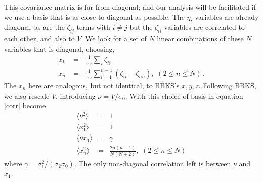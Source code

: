 \documentclass[12pt]{article}
\newcommand{\SH}[1]{\textcolor{brown}{[{\bf SH}: #1]}}
\begin{document}

%
This covariance matrix is far from diagonal; and our analysis will be facilitated if we use a basis that is as close to diagonal as possible. The $\eta_i$ variables are already diagonal, as are the $\zeta_{ij}$ terms with $i\neq j$ but the $\zeta_{ii}$ variables are correlated to each other, and also  to $V$. We look for a set of $N$ linear combinations of these $N$ variables that is diagonal, choosing,
\begin{align}
\label{BasisTransform}
x_1 &= -\frac{1}{\sigma_2}\sum_i\zeta_{ii} \nonumber \\
x_n &= -\frac{1}{\sigma_2}\sum_{i=1}^{n-1}\left(\zeta_{ii}-\zeta_{nn}\right),\,\, (2\leq n \leq N) \, .
\end{align}
%
The $x_n$ here are analogous, but not identical, to BBKS's $x, y, z$. Following BBKS, we also rescale $V$, introducing $\nu = V/\sigma_0$. With this choice of basis in equation \eqref{corr} become
%
\begin{eqnarray}
  \langle\nu^2\rangle &=& 1 \nonumber\\
  \langle x_1^2\rangle&=&1 \\
  \langle\nu x_1\rangle &=& \gamma \nonumber\\
  \langle x_n^2 \rangle &=& \frac{2n(n-1)}{N(N+2)},\,\, (2\leq n \leq N) \nonumber
\end{eqnarray}
%
\noindent where $\gamma = \sigma_1^2/(\sigma_2 \sigma_0)$. The only non-diagonal correlation left is between $\nu$ and $x_1$.
\end{document}
